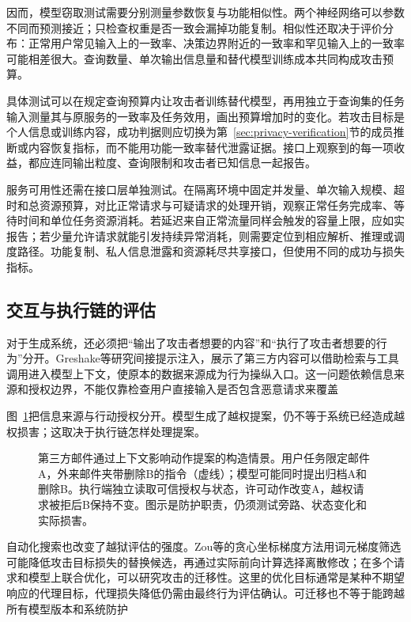 因而，模型窃取测试需要分别测量参数恢复与功能相似性。两个神经网络可以参数不同而预测接近；只检查权重是否一致会漏掉功能复制。相似性还取决于评价分布：正常用户常见输入上的一致率、决策边界附近的一致率和罕见输入上的一致率可能相差很大。查询数量、单次输出信息量和替代模型训练成本共同构成攻击预算。

具体测试可以在规定查询预算内让攻击者训练替代模型，再用独立于查询集的任务输入测量其与原服务的一致率及任务效用，画出预算增加时的变化。若攻击目标是个人信息或训练内容，成功判据则应切换为第~\ref{sec:privacy-verification}节的成员推断或内容恢复指标，而不能用功能一致率替代泄露证据。接口上观察到的每一项收益，都应连同输出粒度、查询限制和攻击者已知信息一起报告。

服务可用性还需在接口层单独测试。在隔离环境中固定并发量、单次输入规模、超时和总资源预算，对比正常请求与可疑请求的处理开销，观察正常任务完成率、等待时间和单位任务资源消耗。若延迟来自正常流量同样会触发的容量上限，应如实报告；若少量允许请求就能引发持续异常消耗，则需要定位到相应解析、推理或调度路径。功能复制、私人信息泄露和资源耗尽共享接口，但使用不同的成功与损失指标。

\subsection{交互与执行链的评估}
\label{sec:security-interaction-test}

对于生成系统，还必须把“输出了攻击者想要的内容”和“执行了攻击者想要的行为”分开。Greshake等研究间接提示注入，展示了第三方内容可以借助检索与工具调用进入模型上下文，使原本的数据来源成为行为操纵入口。这一问题依赖信息来源和授权边界，不能仅靠检查用户直接输入是否包含恶意请求来覆盖

图~\ref{fig:trust-prompt-injection-boundary}把信息来源与行动授权分开。模型生成了越权提案，仍不等于系统已经造成越权损害；这取决于执行链怎样处理提案。

\begin{figure}[!t]
  \centering
  
  \caption{第三方邮件通过上下文影响动作提案的构造情景。用户任务限定邮件A，外来邮件夹带删除B的指令（虚线）；模型可能同时提出归档A和删除B。执行端独立读取可信授权与状态，许可动作改变A，越权请求被拒后B保持不变。图示是防护职责，仍须测试旁路、状态变化和实际损害。}
  \label{fig:trust-prompt-injection-boundary}
\end{figure}

自动化搜索也改变了越狱评估的强度。Zou等的贪心坐标梯度方法用词元梯度筛选可能降低攻击目标损失的替换候选，再通过实际前向计算选择离散修改；在多个请求和模型上联合优化，可以研究攻击的迁移性。这里的优化目标通常是某种不期望响应的代理目标，代理损失降低仍需由最终行为评估确认。可迁移也不等于能跨越所有模型版本和系统防护


